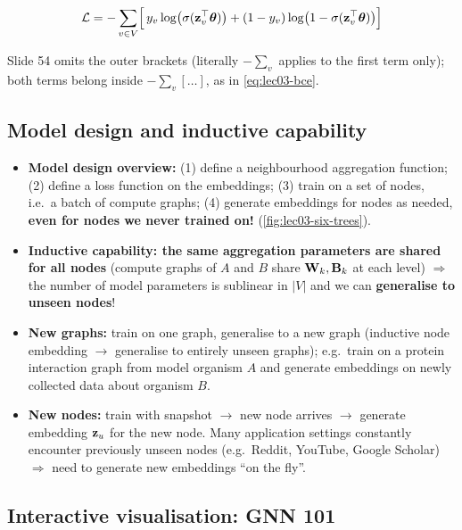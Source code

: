 \begin{equation}\label{eq:lec03-bce}
  \mathcal{L} = -\sum_{v\in V}\Bigl[\,y_v\log\bigl(\sigma(\mathbf{z}_v^{\top}\bm{\theta})\bigr)
  + (1-y_v)\log\bigl(1-\sigma(\mathbf{z}_v^{\top}\bm{\theta})\bigr)\Bigr]
\end{equation}
\begin{caution}
  Slide 54 omits the outer brackets (literally $-\sum_v$ applies to the first
  term only); both terms belong inside $-\sum_v[\dots]$, as in \cref{eq:lec03-bce}.
\end{caution}

\subsection{Model design and inductive capability}\label{sec:lec03-inductive}

\begin{itemize}
  \item \textbf{Model design overview:} (1) define a neighbourhood aggregation
    function; (2) define a loss function on the embeddings; (3) train on a set
    of nodes, i.e.\ a batch of compute graphs; (4) generate embeddings for
    nodes as needed, \textbf{even for nodes we never trained on!}
    (\cref{fig:lec03-six-trees}).
  \item \textbf{Inductive capability: the same aggregation parameters are
    shared for all nodes} (compute graphs of $A$ and $B$ share $\mathbf{W}_k,\mathbf{B}_k$ at
    each level) $\Rightarrow$ the number of model parameters is sublinear in
    $|V|$ and we can \textbf{generalise to unseen nodes}!
  \item \textbf{New graphs:} train on one graph, generalise to a new graph
    (inductive node embedding $\to$ generalise to entirely unseen graphs); e.g.\
    train on a protein interaction graph from model organism $A$ and generate
    embeddings on newly collected data about organism $B$.
  \item \textbf{New nodes:} train with snapshot $\to$ new node arrives $\to$
    generate embedding $\mathbf{z}_u$ for the new node. Many application settings
    constantly encounter previously unseen nodes (e.g.\ Reddit, YouTube,
    Google Scholar) $\Rightarrow$ need to generate new embeddings ``on the
    fly''.
\end{itemize}

\subsection{Interactive visualisation: GNN 101}\label{sec:lec03-gnn101}
\slides{61--62}

